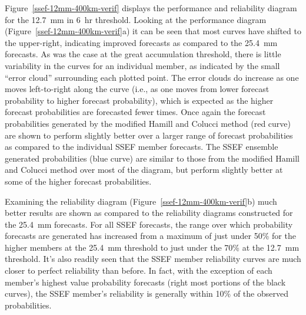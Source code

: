 \mbox{Figure \ref{ssef-12mm-400km-verif}} displays the performance and reliability diagram for the \mbox{12.7 mm} in \mbox{6 hr} threshold.
Looking at the performance diagram (\mbox{Figure \ref{ssef-12mm-400km-verif}a}) it can be seen that most curves have shifted to the upper-right, indicating improved forecasts as compared to the \mbox{25.4 mm} forecasts.
As was the case at the great accumulation threshold, there is little variability in the curves for an individual member, as indicated by the small ``error cloud'' surrounding each plotted point.
The error clouds do increase as one moves left-to-right along the curve (i.e., as one moves from lower forecast probability to higher forecast probability), which is expected as the higher forecast probabilities are forecasted fewer times.
Once again the forecast probabilities generated by the modified Hamill and Colucci method (red curve) are shown to perform slightly better over a larger range of forecast probabilities as compared to the individual SSEF member forecasts.
The SSEF ensemble generated probabilities (blue curve) are similar to those from the modified Hamill and Colucci method over most of the diagram, but perform slightly better at some of the higher forecast probabilities.


Examining the reliability diagram (\mbox{Figure \ref{ssef-12mm-400km-verif}b}) much better results are shown as compared to the reliability diagrams constructed for the \mbox{25.4 mm} forecasts.
For all SSEF forecasts, the range over which probability forecasts are generated has increased from a maximum of just under 50\% for the higher members at the \mbox{25.4 mm} threshold to just under the 70\% at the \mbox{12.7 mm} threshold.
It's also readily seen that the SSEF member reliability curves are much closer to perfect reliability than before.
In fact, with the exception of each member's highest value probability forecasts (right most portions of the black curves), the SSEF member's reliability is generally within 10\% of the observed probabilities.


